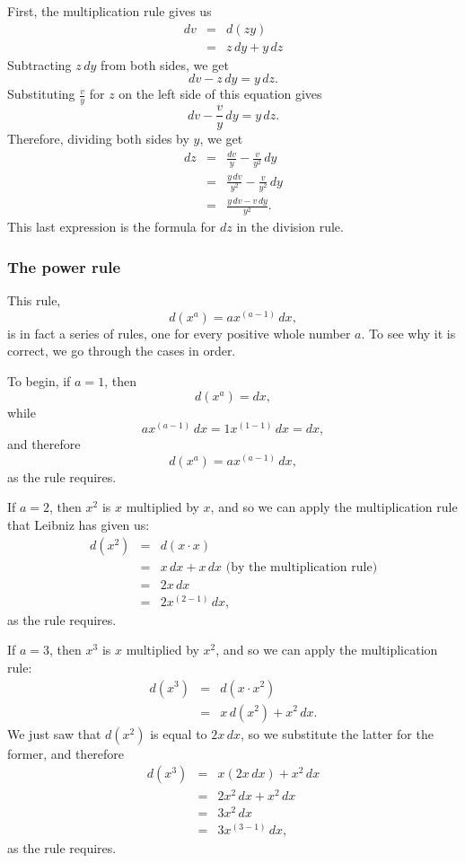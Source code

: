 \documentclass[polutonikogreek,english,twoside,openright]{article}
\newlength{\oldjot}
\begin{document}
First, the multiplication rule gives us
\setlength{\jot}{1.5ex}
\begin{eqnarray*}
dv & = & d(zy)\\
& = & z\,dy  + y\,dz
\end{eqnarray*}
Subtracting $z\,dy$ from both sides, we get
$$dv - z\,dy = y\,dz.$$
Substituting $\frac{v}{y}$ for $z$ on the left side of this equation gives
$$ dv - \frac{v}{y}\, dy = y\,dz.$$
Therefore, dividing both sides by $y$, we get
\setlength{\jot}{1.5ex}
\begin{eqnarray*}
dz & = & \frac{dv}{y} - \frac{v}{y^2}\,dy\\
& = & \frac{y\,dv}{y^2} - \frac{v}{y^2}\,dy\\
& = & \frac{y\,dv - v\,dy}{y^2}.
\end{eqnarray*}
\setlength{\jot}{\oldjot}
This last expression is the formula for $dz$ in the division rule.

\subsubsection*{The power rule}

This rule,
$$d(x^a) = ax^{(a-1)}\,dx,$$
is in fact a series of rules, one for every positive whole number $a$.
To see why it is correct, we go through the cases in order.

To begin, if $a=1$, then
$$d(x^a) = dx,$$
while 
$$ax^{(a-1)}\,dx = 1x^{(1-1)}\,dx = dx,$$
and therefore
$$d(x^a) = ax^{(a-1)}\,dx,$$
as the rule requires.


If $a=2$, then $x^2$ is $x$ multiplied by $x$, and so we can apply the
multiplication rule that Leibniz has given us:
\begin{eqnarray*}
d(x^2)&  = & d(x\cdot x) \\
 & = & x\,dx + x\,dx \mbox{ (by the multiplication rule)}\\
  & = & 2x\,dx \\
  & = & 2x^{(2-1)}\,dx,
 \end{eqnarray*}
as the rule requires.

If $a=3$, then $x^3$ is $x$ multiplied by $x^2$, and so we can apply
the multiplication rule:
\begin{eqnarray*}
d(x^3) & = & d(x\cdot x^2) \\
 & = & x\,d(x^2) + x^2\,dx.
 \end{eqnarray*}
 We just saw that $d(x^2)$ is equal to $2x\,dx$, so we substitute the
 latter for the former, and therefore
\begin{eqnarray*}
d(x^3) & = & x(2x\,dx) + x^2\,dx \\
 & = & 2x^2\,dx + x^2\,dx \\
  & = & 3x^2\,dx \\
   & = & 3x^{(3-1)}\,dx,
 \end{eqnarray*}
as the rule requires.
\end{document}
